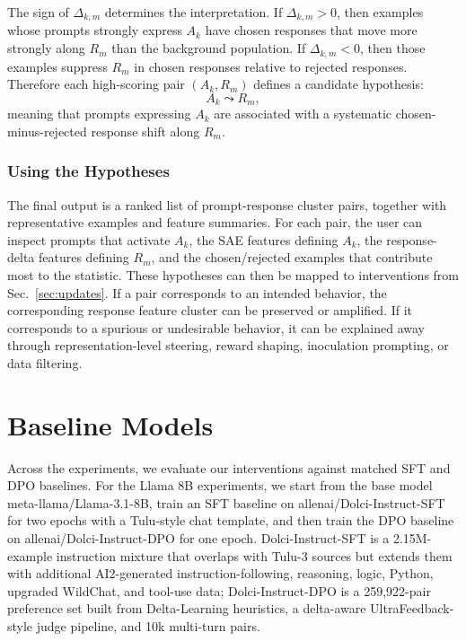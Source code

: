 \documentclass{article} %
\begin{document}
The sign of $\Delta_{k,m}$ determines the interpretation. If $\Delta_{k,m}>0$, then examples whose prompts strongly express $A_k$ have chosen responses that move more strongly along $R_m$ than the background population. If $\Delta_{k,m}<0$, then those examples suppress $R_m$ in chosen responses relative to rejected responses. Therefore each high-scoring pair $(A_k,R_m)$ defines a candidate hypothesis:
\begin{equation}
A_k \leadsto R_m,
\end{equation}
meaning that prompts expressing $A_k$ are associated with a systematic chosen-minus-rejected response shift along $R_m$.

\subsubsection{Using the Hypotheses}
\label{app:pcfs-using-hypotheses}

The final output is a ranked list of prompt-response cluster pairs, together with representative examples and feature summaries. For each pair, the user can inspect prompts that activate $A_k$, the SAE features defining $A_k$, the response-delta features defining $R_m$, and the chosen/rejected examples that contribute most to the statistic. These hypotheses can then be mapped to interventions from Sec.~\ref{sec:updates}. If a pair corresponds to an intended behavior, the corresponding response feature cluster can be preserved or amplified. If it corresponds to a spurious or undesirable behavior, it can be explained away through representation-level steering, reward shaping, inoculation prompting, or data filtering.




\clearpage
\section{Baseline Models}

Across the experiments, we evaluate our interventions against matched SFT and DPO baselines. For the Llama 8B experiments, we start from the base model meta-llama/Llama-3.1-8B, train an SFT baseline on allenai/Dolci-Instruct-SFT for two epochs with a Tulu-style chat template, and then train the DPO baseline on allenai/Dolci-Instruct-DPO for one epoch. Dolci-Instruct-SFT is a 2.15M-example instruction mixture that overlaps with Tulu-3 sources but extends them with additional AI2-generated instruction-following, reasoning, logic, Python, upgraded WildChat, and tool-use data; Dolci-Instruct-DPO is a 259,922-pair preference set built from Delta-Learning heuristics, a delta-aware UltraFeedback-style judge pipeline, and 10k multi-turn pairs. 
\end{document}
